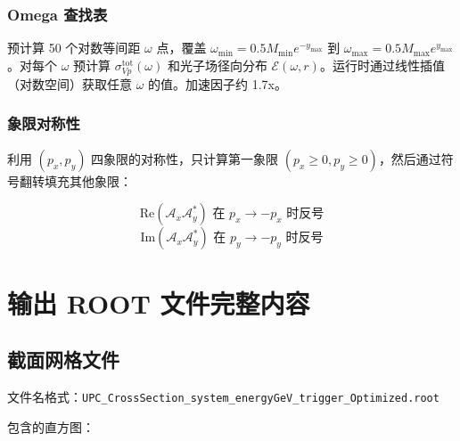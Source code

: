 \documentclass[11pt,a4paper,UTF8]{ctexart}
\begin{document}
\subsubsection{Omega 查找表}

预计算 50 个对数等间距 $\omega$ 点，覆盖 $\omega_{\text{min}} = 0.5 M_{\text{min}} e^{-y_{\text{max}}}$ 到 $\omega_{\text{max}} = 0.5 M_{\text{max}} e^{y_{\text{max}}}$。对每个 $\omega$ 预计算 $\sigma_{Vp}^{\text{tot}}(\omega)$ 和光子场径向分布 $\mathcal{E}(\omega, r)$。运行时通过线性插值（对数空间）获取任意 $\omega$ 的值。加速因子约 1.7x。

\subsubsection{象限对称性}

利用 $(p_x, p_y)$ 四象限的对称性，只计算第一象限 $(p_x \ge 0, p_y \ge 0)$，然后通过符号翻转填充其他象限：

\[
\text{Re}(\mathcal{A}_x \mathcal{A}_y^*) \text{ 在 } p_x \to -p_x \text{ 时反号}
\]
\[
\text{Im}(\mathcal{A}_x \mathcal{A}_y^*) \text{ 在 } p_y \to -p_y \text{ 时反号}
\]

\section{输出 ROOT 文件完整内容}

\subsection{截面网格文件}

文件名格式：\texttt{UPC\_CrossSection\_{system}\_{energy}GeV\_{trigger}\_Optimized.root}

包含的直方图：
\end{document}
